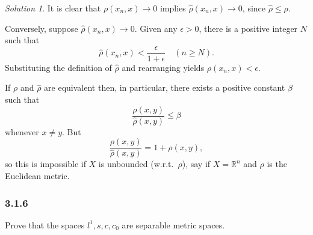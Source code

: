 \documentclass{report}
\newcommand{\bb}[1]{\mathbb{#1}}
\theoremstyle{remark}
\newtheorem*{solution}{Solution}
\begin{document}
\begin{solution}
  It is clear that $\rho(x_n, x) \to 0$ implies $\hat \rho (x_n, x) \to 0$, since $\hat \rho \le \rho$.
  
  Conversely, suppose $\hat \rho(x_n, x) \to 0$. Given any $\epsilon > 0$, there is a positive integer $N$ such that
  \begin{equation*}
    \hat \rho(x_n, x) < \frac{\epsilon}{1 + \epsilon} \quad (n \ge N).
  \end{equation*}
  Substituting the definition of $\hat \rho$ and rearranging yields $\rho(x_n, x) < \epsilon$.

  If $\rho$ and $\hat \rho$ are equivalent then, in particular, there exists a positive constant $\beta$ such that
  \begin{equation*}
    \frac{\rho(x,y)}{\hat \rho(x,y)} \le \beta
  \end{equation*}
  whenever $x \ne y$. But
  \begin{equation*}
    \frac{\rho(x,y)}{\hat \rho(x,y)} = 1 + \rho(x,y),
  \end{equation*}
  so this is impossible if $X$ is unbounded (w.r.t.\ $\rho$), say if $X = \bb R^n$ and $\rho$ is the Euclidean metric.
\end{solution}

\subsubsection*{3.1.6}
Prove that the spaces $l^1, s, c, c_0$ are separable metric spaces.
\end{document}
